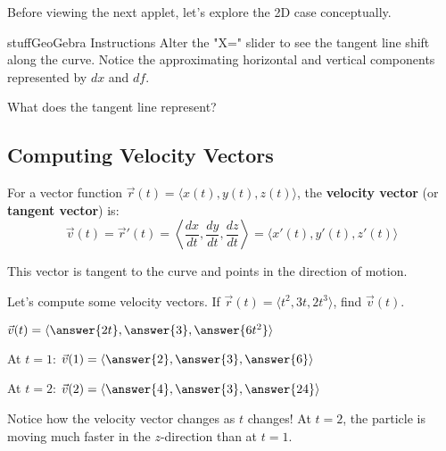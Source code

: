 \documentclass{ximera}
\begin{document}
\begin{problem}
Before viewing the next applet, let's explore the 2D case conceptually.

\begin{expandable}{stuff}{GeoGebra Instructions}
    Alter the "X=" slider to see the tangent line shift along the curve. Notice the approximating horizontal and vertical components represented by $dx$ and $df$.
\end{expandable}

\begin{center}
\end{center}

What does the tangent line represent?
\begin{multipleChoice}
\end{multipleChoice}
\end{problem}

\subsection*{Computing Velocity Vectors}

\begin{definition}
For a vector function $\vec{r}(t) = \langle x(t), y(t), z(t) \rangle$, the \textbf{velocity vector} (or \textbf{tangent vector}) is:
$$\vec{v}(t) = \vec{r}'(t) = \left\langle \frac{dx}{dt}, \frac{dy}{dt}, \frac{dz}{dt} \right\rangle = \langle x'(t), y'(t), z'(t) \rangle$$

This vector is tangent to the curve and points in the direction of motion.
\end{definition}

\begin{problem}
Let's compute some velocity vectors. If $\vec{r}(t) = \langle t^2, 3t, 2t^3 \rangle$, find $\vec{v}(t)$.

$\vec{v}(t) = \langle \answer{2t}, \answer{3}, \answer{6t^2} \rangle$

At $t=1$: $\vec{v}(1) = \langle \answer{2}, \answer{3}, \answer{6} \rangle$

At $t=2$: $\vec{v}(2) = \langle \answer{4}, \answer{3}, \answer{24} \rangle$

\begin{feedback}
Notice how the velocity vector changes as $t$ changes! At $t=2$, the particle is moving much faster in the $z$-direction than at $t=1$.
\end{feedback}
\end{problem}
\end{document}
